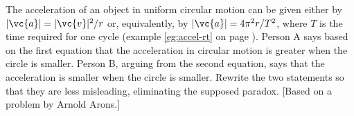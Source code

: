  The acceleration of an object in uniform circular motion
can be given either by $|\vc{a}|=|\vc{v}|^2/r$ or, equivalently, by
$|\vc{a}|=4\pi^2r/T^2$, where $T$ is the time required for one
cycle (example \ref{eg:accel-rt} on page \pageref{eg:accel-rt}). Person A says based on the first equation that
the acceleration in circular motion is greater when the
circle is smaller. Person B, arguing from the second
equation, says that the acceleration is smaller when the
circle is smaller. Rewrite the two statements so that they
are less misleading, eliminating the supposed paradox.
[Based on a problem by Arnold Arons.]
